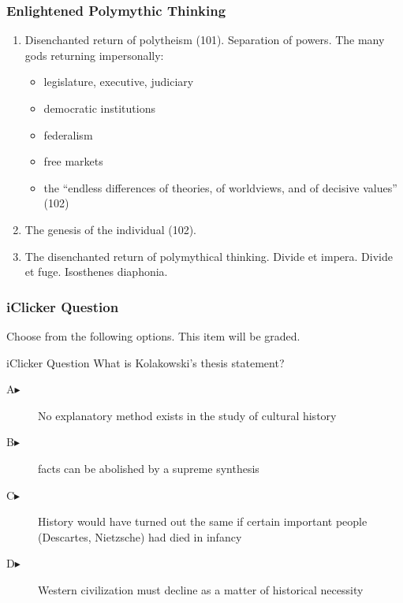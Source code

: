 \documentclass[xcolor=dvipsnames]{beamer}
\begin{document}
\begin{frame}
  \frametitle{Enlightened Polymythic Thinking}
  \begin{enumerate}
  \item Disenchanted return of polytheism (101). Separation of powers.
    The many gods returning impersonally:
    \begin{itemize}
    \item legislature, executive, judiciary
    \item democratic institutions
    \item federalism
    \item free markets
    \item the ``endless differences of theories, of worldviews, and of
      decisive values'' (102)
    \end{itemize}
  \item The genesis of the individual (102). 
  \item The disenchanted return of polymythical thinking. Divide et
    impera. Divide et fuge. Isosthenes diaphonia.
  \end{enumerate}
\end{frame}

\begin{frame}
  \frametitle{iClicker Question}
Choose from the following options. This item will be graded.
\begin{block}{iClicker Question}
What is Kolakowski's thesis statement?
\end{block}
\begin{description}
\item[A\hspace{.2in}$\blacktriangleright$] No explanatory method exists in the study of cultural history
\item[B\hspace{.2in}$\blacktriangleright$] facts can be abolished by a supreme synthesis
\item[C\hspace{.2in}$\blacktriangleright$] History would have turned out the same if certain important people (Descartes, Nietzsche) had died in infancy
\item[D\hspace{.2in}$\blacktriangleright$] Western civilization must decline as a matter of historical necessity
\end{description}
\end{frame}
\end{document}

